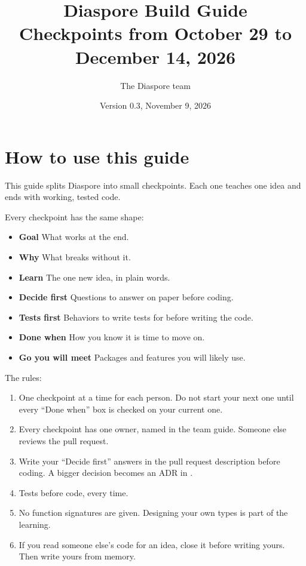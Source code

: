 \documentclass[11pt,letterpaper]{article}
\title{\textbf{Diaspore Build Guide}\\[0.3em]\large Checkpoints from October 29 to December 14, 2026}
\author{The Diaspore team}
\date{Version 0.3, November 9, 2026}
\newcommand{\code}[1]{\texttt{\detokenize{#1}}}
\newcommand{\lbl}[1]{\textbf{#1}\enspace}
\begin{document}
\maketitle

\tableofcontents

\newpage

\section{How to use this guide}

This guide splits Diaspore into small checkpoints. Each one teaches one idea and ends with working, tested code.

Every checkpoint has the same shape:

\begin{itemize}
  \item \lbl{Goal} What works at the end.
  \item \lbl{Why} What breaks without it.
  \item \lbl{Learn} The one new idea, in plain words.
  \item \lbl{Decide first} Questions to answer on paper before coding.
  \item \lbl{Tests first} Behaviors to write tests for before writing the code.
  \item \lbl{Done when} How you know it is time to move on.
  \item \lbl{Go you will meet} Packages and features you will likely use.
\end{itemize}

The rules:

\begin{enumerate}
  \item One checkpoint at a time for each person. Do not start your next one until every ``Done when'' box is checked on your current one.
  \item Every checkpoint has one owner, named in the team guide. Someone else reviews the pull request.
  \item Write your ``Decide first'' answers in the pull request description before coding. A bigger decision becomes an ADR in \code{docs/adr/}.
  \item Tests before code, every time.
  \item No function signatures are given. Designing your own types is part of the learning.
  \item If you read someone else's code for an idea, close it before writing yours. Then write yours from memory.
\end{enumerate}
\end{document}
